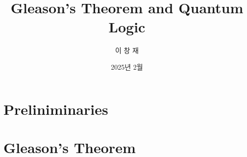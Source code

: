 \documentclass[twoside, 11pt]{report}
\title{Gleason's Theorem and Quantum Logic}
\author{이 창 재}
\date{2025년 2월}
\theoremstyle{definition}
\theoremstyle{plain}
\theoremstyle{remark}
\begin{document}




\tableofcontents

\chapter{Preliniminaries}\label{chapter:Preliminaries}


\chapter{Gleason's Theorem}\label{chapter:Gleason's Theorem}








\end{document}
